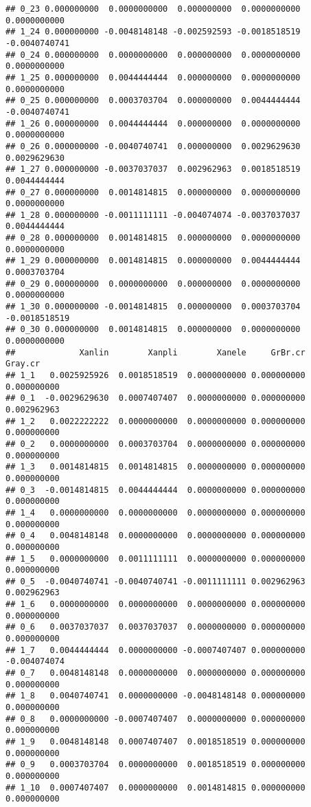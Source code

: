 \documentclass[]{article}
\begin{document}
\begin{verbatim}
## 0_23 0.000000000  0.0000000000  0.000000000  0.0000000000  0.0000000000
## 1_24 0.000000000 -0.0048148148 -0.002592593 -0.0018518519 -0.0040740741
## 0_24 0.000000000  0.0000000000  0.000000000  0.0000000000  0.0000000000
## 1_25 0.000000000  0.0044444444  0.000000000  0.0000000000  0.0000000000
## 0_25 0.000000000  0.0003703704  0.000000000  0.0044444444 -0.0040740741
## 1_26 0.000000000  0.0044444444  0.000000000  0.0000000000  0.0000000000
## 0_26 0.000000000 -0.0040740741  0.000000000  0.0029629630  0.0029629630
## 1_27 0.000000000 -0.0037037037  0.002962963  0.0018518519  0.0044444444
## 0_27 0.000000000  0.0014814815  0.000000000  0.0000000000  0.0000000000
## 1_28 0.000000000 -0.0011111111 -0.004074074 -0.0037037037  0.0044444444
## 0_28 0.000000000  0.0014814815  0.000000000  0.0000000000  0.0000000000
## 1_29 0.000000000  0.0014814815  0.000000000  0.0044444444  0.0003703704
## 0_29 0.000000000  0.0000000000  0.000000000  0.0000000000  0.0000000000
## 1_30 0.000000000 -0.0014814815  0.000000000  0.0003703704 -0.0018518519
## 0_30 0.000000000  0.0014814815  0.000000000  0.0000000000  0.0000000000
##             Xanlin        Xanpli        Xanele     GrBr.cr      Gray.cr
## 1_1   0.0025925926  0.0018518519  0.0000000000 0.000000000  0.000000000
## 0_1  -0.0029629630  0.0007407407  0.0000000000 0.000000000  0.002962963
## 1_2   0.0022222222  0.0000000000  0.0000000000 0.000000000  0.000000000
## 0_2   0.0000000000  0.0003703704  0.0000000000 0.000000000  0.000000000
## 1_3   0.0014814815  0.0014814815  0.0000000000 0.000000000  0.000000000
## 0_3  -0.0014814815  0.0044444444  0.0000000000 0.000000000  0.000000000
## 1_4   0.0000000000  0.0000000000  0.0000000000 0.000000000  0.000000000
## 0_4   0.0048148148  0.0000000000  0.0000000000 0.000000000  0.000000000
## 1_5   0.0000000000  0.0011111111  0.0000000000 0.000000000  0.000000000
## 0_5  -0.0040740741 -0.0040740741 -0.0011111111 0.002962963  0.002962963
## 1_6   0.0000000000  0.0000000000  0.0000000000 0.000000000  0.000000000
## 0_6   0.0037037037  0.0037037037  0.0000000000 0.000000000  0.000000000
## 1_7   0.0044444444  0.0000000000 -0.0007407407 0.000000000 -0.004074074
## 0_7   0.0048148148  0.0000000000  0.0000000000 0.000000000  0.000000000
## 1_8   0.0040740741  0.0000000000 -0.0048148148 0.000000000  0.000000000
## 0_8   0.0000000000 -0.0007407407  0.0000000000 0.000000000  0.000000000
## 1_9   0.0048148148  0.0007407407  0.0018518519 0.000000000  0.000000000
## 0_9   0.0003703704  0.0000000000  0.0018518519 0.000000000  0.000000000
## 1_10  0.0007407407  0.0000000000  0.0014814815 0.000000000  0.000000000

\end{verbatim}
\end{document}

